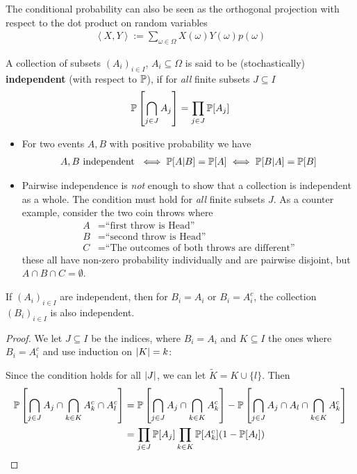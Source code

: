 The conditional probability can also be seen as the orthogonal projection with respect to the dot product on random variables
\begin{align*}
  \left<X,Y\right> := \sum_{\omega \in \Omega}X(\omega)Y(\omega) p(\omega)
\end{align*}



\begin{dfn}[]
  A collection of subsets $(A_i)_{i \in I}$, $A_i \subseteq \Omega$ is said to be (stochastically) \textbf{independent} (with respect to $\mathbb{P}$), if for \emph{all} finite subsets $J \subseteq I$
  \begin{align*}
    \mathbb{P}\left[
      \bigcap_{j \in J}A_j  
    \right]
    =
    \prod_{j \in J} \mathbb{P}[A_j]
  \end{align*}
\end{dfn}
\begin{rem}
\begin{itemize}
  \item For two events $A,B$ with positive probability we have
    \begin{align*}
      A,B \text{ independent } \iff \mathbb{P}[A|B] = \mathbb{P}[A] \iff \mathbb{P}[B|A] = \mathbb{P}[B]
    \end{align*}
  \item Pairwise independence is \emph{not} enough to show that a collection is independent as a whole. The condition must hold for \emph{all} finite subsets $J$.
    As a counter example, consider the two coin throws where
    \begin{align*}
      A &= \text{``first throw is Head''}\\
      B &= \text{``second throw is Head''}\\
      C &= \text{``The outcomes of both throws are different''}
    \end{align*}
    these all have non-zero probability individually and are pairwise disjoint, but $A \cap B \cap C = \emptyset$.
\end{itemize}
\end{rem}

\begin{lem}[]
  If $(A_i)_{i \in I}$ are independent, then for $B_i = A_i$ or $B_i = A_i^{c}$, the collection $(B_i)_{i \in I}$ is also independent.
\end{lem}

\begin{proof}
We let $J \subseteq I$ be the indices, where $B_i = A_i$ and $K \subseteq I$ the ones where $B_i = A_i^{c}$ and use induction on $\vert K\vert = k$:

Since the condition holds for all $\vert J\vert$, we can let $\tilde{K} = K \cup \{l\}$. Then
\begin{align*}
  \mathbb{P}\left[
    \bigcap_{j \in J}A_j \cap \bigcap_{k \in K} A_k^{c} \cap A_l^{c}
  \right]
    &=
    \mathbb{P}\left[
      \bigcap_{j \in J}A_j \cap \bigcap_{k \in K}A_k^{c}
    \right]
    -
    \mathbb{P}\left[
      \bigcap_{j \in J}A_j \cap A_l \cap\bigcap_{k \in K}A_k^{c}
    \right]
    \\
    &= \prod_{j \in J}\mathbb{P}[A_j]\prod_{k \in K} \mathbb{P}[A_k^{c}](1 - \mathbb{P}[A_l])
\end{align*}
\end{proof}

